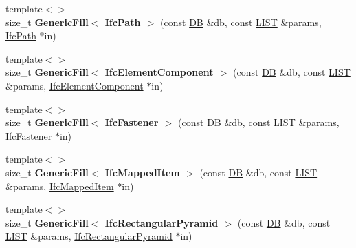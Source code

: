 \begin{DoxyCompactItemize}
\item 
\hypertarget{namespace_assimp_1_1_s_t_e_p_a29a01e12152518d2dc1d69648dba84f7}{{\footnotesize template$<$$>$ }\\size\+\_\+t {\bfseries Generic\+Fill$<$ Ifc\+Path $>$} (const \hyperlink{class_assimp_1_1_s_t_e_p_1_1_d_b}{D\+B} \&db, const \hyperlink{class_assimp_1_1_s_t_e_p_1_1_e_x_p_r_e_s_s_1_1_l_i_s_t}{L\+I\+S\+T} \&params, \hyperlink{struct_assimp_1_1_i_f_c_1_1_ifc_path}{Ifc\+Path} $\ast$in)}\label{namespace_assimp_1_1_s_t_e_p_a29a01e12152518d2dc1d69648dba84f7}

\item 
\hypertarget{namespace_assimp_1_1_s_t_e_p_ac01b594ea7ece0d921b4c320b3da5b6d}{{\footnotesize template$<$$>$ }\\size\+\_\+t {\bfseries Generic\+Fill$<$ Ifc\+Element\+Component $>$} (const \hyperlink{class_assimp_1_1_s_t_e_p_1_1_d_b}{D\+B} \&db, const \hyperlink{class_assimp_1_1_s_t_e_p_1_1_e_x_p_r_e_s_s_1_1_l_i_s_t}{L\+I\+S\+T} \&params, \hyperlink{struct_assimp_1_1_i_f_c_1_1_ifc_element_component}{Ifc\+Element\+Component} $\ast$in)}\label{namespace_assimp_1_1_s_t_e_p_ac01b594ea7ece0d921b4c320b3da5b6d}

\item 
\hypertarget{namespace_assimp_1_1_s_t_e_p_a0dca5403a13993faba9e00a2f5fe2663}{{\footnotesize template$<$$>$ }\\size\+\_\+t {\bfseries Generic\+Fill$<$ Ifc\+Fastener $>$} (const \hyperlink{class_assimp_1_1_s_t_e_p_1_1_d_b}{D\+B} \&db, const \hyperlink{class_assimp_1_1_s_t_e_p_1_1_e_x_p_r_e_s_s_1_1_l_i_s_t}{L\+I\+S\+T} \&params, \hyperlink{struct_assimp_1_1_i_f_c_1_1_ifc_fastener}{Ifc\+Fastener} $\ast$in)}\label{namespace_assimp_1_1_s_t_e_p_a0dca5403a13993faba9e00a2f5fe2663}

\item 
\hypertarget{namespace_assimp_1_1_s_t_e_p_a95a127406c83dcb1aeee26e248fd54bc}{{\footnotesize template$<$$>$ }\\size\+\_\+t {\bfseries Generic\+Fill$<$ Ifc\+Mapped\+Item $>$} (const \hyperlink{class_assimp_1_1_s_t_e_p_1_1_d_b}{D\+B} \&db, const \hyperlink{class_assimp_1_1_s_t_e_p_1_1_e_x_p_r_e_s_s_1_1_l_i_s_t}{L\+I\+S\+T} \&params, \hyperlink{struct_assimp_1_1_i_f_c_1_1_ifc_mapped_item}{Ifc\+Mapped\+Item} $\ast$in)}\label{namespace_assimp_1_1_s_t_e_p_a95a127406c83dcb1aeee26e248fd54bc}

\item 
\hypertarget{namespace_assimp_1_1_s_t_e_p_a4ab4fe683deede3153cd42379e8baeb8}{{\footnotesize template$<$$>$ }\\size\+\_\+t {\bfseries Generic\+Fill$<$ Ifc\+Rectangular\+Pyramid $>$} (const \hyperlink{class_assimp_1_1_s_t_e_p_1_1_d_b}{D\+B} \&db, const \hyperlink{class_assimp_1_1_s_t_e_p_1_1_e_x_p_r_e_s_s_1_1_l_i_s_t}{L\+I\+S\+T} \&params, \hyperlink{struct_assimp_1_1_i_f_c_1_1_ifc_rectangular_pyramid}{Ifc\+Rectangular\+Pyramid} $\ast$in)}\label{namespace_assimp_1_1_s_t_e_p_a4ab4fe683deede3153cd42379e8baeb8}


\end{DoxyCompactItemize}
